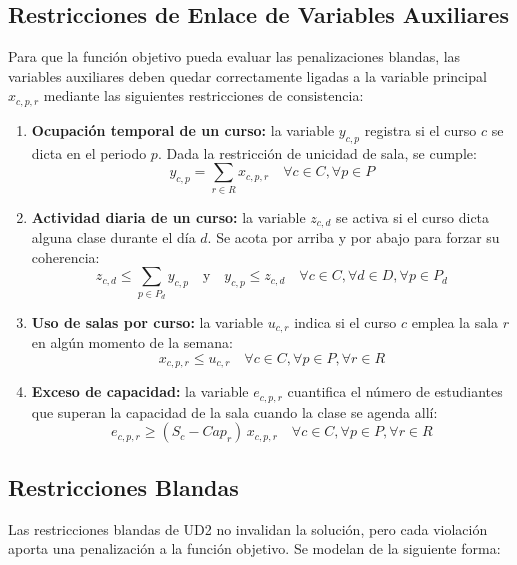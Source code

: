 \documentclass[letter, 10pt]{article}
\begin{document}
\subsection{Restricciones de Enlace de Variables Auxiliares}
Para que la función objetivo pueda evaluar las penalizaciones blandas, las variables auxiliares deben quedar correctamente ligadas a la variable principal $x_{c,p,r}$ mediante las siguientes restricciones de consistencia:

\begin{enumerate}
    \item \textbf{Ocupación temporal de un curso:} la variable $y_{c,p}$ registra si el curso $c$ se dicta en el periodo $p$. Dada la restricción de unicidad de sala, se cumple:
    \begin{equation}
    y_{c,p} = \sum_{r \in R} x_{c,p,r} \quad \forall c \in C, \forall p \in P
    \end{equation}

    \item \textbf{Actividad diaria de un curso:} la variable $z_{c,d}$ se activa si el curso dicta alguna clase durante el día $d$. Se acota por arriba y por abajo para forzar su coherencia:
    \begin{equation}
    z_{c,d} \leq \sum_{p \in P_d} y_{c,p} \quad \text{y} \quad y_{c,p} \leq z_{c,d} \quad \forall c \in C, \forall d \in D, \forall p \in P_d
    \end{equation}

    \item \textbf{Uso de salas por curso:} la variable $u_{c,r}$ indica si el curso $c$ emplea la sala $r$ en algún momento de la semana:
    \begin{equation}
    x_{c,p,r} \leq u_{c,r} \quad \forall c \in C, \forall p \in P, \forall r \in R
    \end{equation}

    \item \textbf{Exceso de capacidad:} la variable $e_{c,p,r}$ cuantifica el número de estudiantes que superan la capacidad de la sala cuando la clase se agenda allí:
    \begin{equation}
    e_{c,p,r} \geq (S_c - Cap_r)\, x_{c,p,r} \quad \forall c \in C, \forall p \in P, \forall r \in R
    \end{equation}
\end{enumerate}

\subsection{Restricciones Blandas}
Las restricciones blandas de UD2 no invalidan la solución, pero cada violación aporta una penalización a la función objetivo. Se modelan de la siguiente forma:
\end{document}
